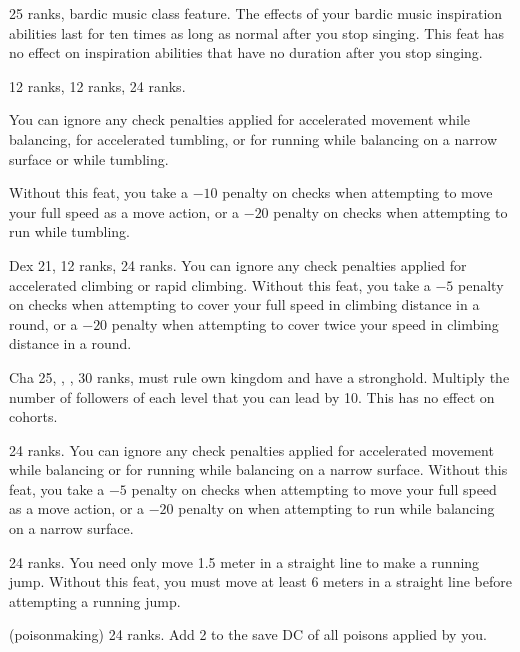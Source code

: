 { 25 ranks, bardic music class feature.}
{The effects of your bardic music inspiration abilities last for ten times as long as normal after you stop singing. This feat has no effect on inspiration abilities that have no duration after you stop singing.}

{}
{ 12 ranks,  12 ranks,  24 ranks.}
{
  You can ignore any check penalties applied for accelerated movement while balancing, for accelerated tumbling, or for running while balancing on a narrow surface or while tumbling.

}
{
  Without this feat, you take a $-10$ penalty on  checks when attempting to move your full speed as a move action, or a $-20$ penalty on  checks when attempting to run while tumbling.
}{}

{}
{Dex 21,  12 ranks,  24 ranks.}
{You can ignore any check penalties applied for accelerated climbing or rapid climbing.}
{Without this feat, you take a $-5$ penalty on  checks when attempting to cover your full speed in climbing distance in a round, or a $-20$ penalty when attempting to cover twice your speed in climbing distance in a round.}{}

{Cha 25, , ,  30 ranks, must rule own kingdom and have a stronghold.}
{Multiply the number of followers of each level that you can lead by 10. This has no effect on cohorts.}

{}
{ 24 ranks.}
{
  You can ignore any check penalties applied for accelerated movement while balancing or for running while balancing on a narrow surface.
}
{
  Without this feat, you take a $-5$ penalty on  checks when attempting to move your full speed as a move action, or a $-20$ penalty on  when attempting to run while balancing on a narrow surface.
}{}

{}
{ 24 ranks.}
{You need only move 1.5 meter in a straight line to make a running jump.}
{Without this feat, you must move at least 6 meters in a straight line before attempting a running jump.}{}

{ (poisonmaking) 24 ranks.}
{Add 2 to the save DC of all poisons applied by you.}

